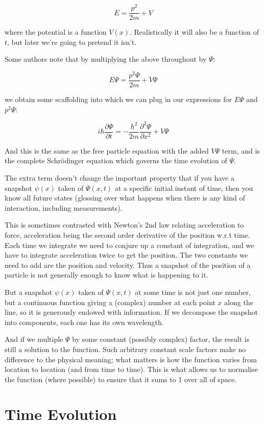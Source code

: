 $$
E = \frac{p^2}{2m} + V
$$

where the potential is a function $V(x)$. Realistically it will also be a function of $t$, but later we're going to pretend it isn't.

Some authors note that by multiplying the above throughout by $\Psi$:

$$
E\Psi = \frac{p^2{\Psi}}{2m} + V{\Psi}
$$

we obtain some scaffolding into which we can plug in our expressions for $E \Psi$ and $p^2 \Psi$:

$$
\label{eqn:se}
i\hbar \frac{\partial \Psi}{\partial t}
=
- \frac{\hbar^2}{2m} \frac{\partial^2 \Psi}{\partial x^2}
+ V{\Psi}
$$

And this is the same as the free particle equation with the added $V\Psi$ term, and is the complete Schrödinger equation which governs the time evolution of $\Psi$.

The extra term doesn't change the important property that if you have a snapshot $\psi(x)$ taken of $\Psi(x, t)$ at a specific initial instant of time, then you know all future states (glossing over what happens when there is any kind of interaction, including measurements).

This is sometimes contrasted with Newton's 2nd law relating acceleration to force, acceleration being the second order derivative of the position w.r.t time. Each time we integrate we need to conjure up a constant of integration, and we have to integrate acceleration twice to get the position. The two constants we need to add are the position and velocity. Thus a snapshot of the position of a particle is not generally enough to know what is happening to it.

But a snapshot $\psi(x)$ taken of $\Psi(x, t)$ at some time is not just one number, but a continuous function giving a (complex) number at each point $x$ along the line, so it is generously endowed with information. If we decompose the snapshot into components, each one has its own wavelength.

And if we multiple $\Psi$ by some constant (possibly complex) factor, the result is still a solution to the function. Such arbitrary constant scale factors make no difference to the physical meaning; what matters is how the function varies from location to location (and from time to time). This is what allows us to normalise the function (where possible) to ensure that it sums to 1 over all of space.

\section{Time Evolution}


